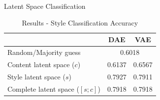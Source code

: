 \documentclass[aspectratio=169]{beamer}
\newcommand{\tabh}[1]{\multicolumn{1}{c|}{\textbf{#1}}}
\begin{document}
\begin{frame}{Latent Space Classification}
	\begin{table}[ht]
		\centering
		\begin{tabular}{| l | r | r |}
			\hline
			                                & \tabh{DAE}                  & \tabh{VAE} \\
			\hline \hline
			Random/Majority guess           & \multicolumn{2}{c|}{0.6018}              \\ \hline \hline
			Content latent space  ($c$)     & 0.6137                      & 0.6567     \\ \hline
			Style latent space ($s$)        & 0.7927                      & 0.7911     \\ \hline
			Complete latent space ($[s;c]$) & 0.7918                      & 0.7918     \\
			\hline
		\end{tabular}
		\caption{Results - Style Classification Accuracy}
		\label{tab:latent-space-classification}
	\end{table}
\end{frame}
\end{document}
